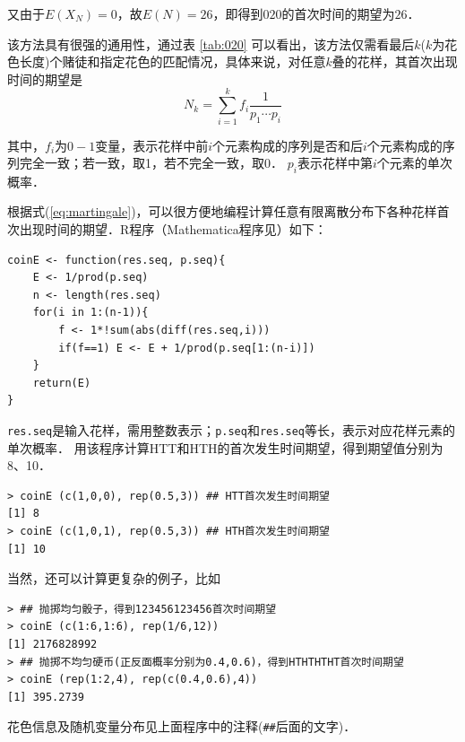 \documentclass{article}
\begin{document}
又由于$E(X_N)=0$，故$E(N)=26$，即得到$020$的首次时间的期望为$26$．

该方法具有很强的通用性，通过表 \ref{tab:020} 可以看出，该方法仅需看最后$k$($k$为花色长度)个赌徒和指定花色的匹配情况，具体来说，对任意$k$叠的花样，其首次出现时间的期望是
\begin{equation}\label{eq:martingale}
N_k = \sum_{i=1}^k f_i \frac{1}{p_{1}\cdots p_{i}}
\end{equation}

其中，$f_i$为$0-1$变量，表示花样中前$i$个元素构成的序列是否和后$i$个元素构成的序列完全一致；若一致，取1，若不完全一致，取0．
$p_i$表示花样中第$i$个元素的单次概率．

根据式(\ref{eq:martingale})，可以很方便地编程计算任意有限离散分布下各种花样首次出现时间的期望．R程序（Mathematica程序见\cite{4}）如下：


\begin{small}
\begin{verbatim}
coinE <- function(res.seq, p.seq){
    E <- 1/prod(p.seq)
    n <- length(res.seq)
    for(i in 1:(n-1)){
        f <- 1*!sum(abs(diff(res.seq,i)))
        if(f==1) E <- E + 1/prod(p.seq[1:(n-i)])
    }
    return(E)
}
\end{verbatim}
\end{small}

\verb|res.seq|是输入花样，需用整数表示；\verb|p.seq|和\verb|res.seq|等长，表示对应花样元素的单次概率．
用该程序计算HTT和HTH的首次发生时间期望，得到期望值分别为8、10．

\begin{small}
\begin{verbatim}
> coinE (c(1,0,0), rep(0.5,3)) ## HTT首次发生时间期望
[1] 8
> coinE (c(1,0,1), rep(0.5,3)) ## HTH首次发生时间期望
[1] 10
\end{verbatim}
\end{small}

当然，还可以计算更复杂的例子，比如

\begin{small}
\begin{verbatim}
> ## 抛掷均匀骰子，得到123456123456首次时间期望
> coinE (c(1:6,1:6), rep(1/6,12))
[1] 2176828992
> ## 抛掷不均匀硬币(正反面概率分别为0.4,0.6)，得到HTHTHTHT首次时间期望
> coinE (rep(1:2,4), rep(c(0.4,0.6),4))
[1] 395.2739
\end{verbatim}
\end{small}

花色信息及随机变量分布见上面程序中的注释(\verb|##|后面的文字)．
\end{document}
